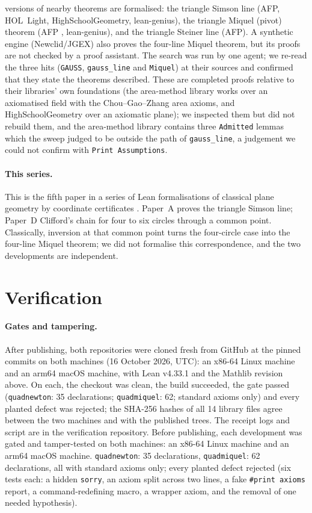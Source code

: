 \documentclass[11pt]{article}
\theoremstyle{definition}
\theoremstyle{remark}
\newcommand{\lean}[1]{\texttt{#1}}
\begin{document}
versions of nearby theorems are formalised: the triangle Simson line (AFP, HOL~Light, HighSchoolGeometry,
lean-genius), the triangle Miquel (pivot) theorem (AFP \cite{afpmiquel}, lean-genius), and the triangle
Steiner line (AFP). A synthetic engine (Newclid/JGEX) also proves the four-line Miquel theorem, but its
proofs are not checked by a proof assistant. The search was run by one agent; we re-read the three
hits (\lean{GAUSS}, \lean{gauss\_line} and \lean{Miquel}) at their sources and confirmed that they state
the theorems described. These are completed proofs relative to their libraries' own foundations
(the area-method library works over an axiomatised field with the Chou--Gao--Zhang area axioms, and
HighSchoolGeometry over an axiomatic plane); we inspected them but did not rebuild them, and the
area-method library contains three \lean{Admitted} lemmas which the sweep judged to be outside the
path of \lean{gauss\_line}, a judgement we could not confirm with \lean{Print Assumptions}.

\paragraph{This series.} This is the fifth paper in a series of Lean formalisations of classical plane
geometry by coordinate certificates \cite{paperA,paperB,paperC,paperD}. Paper~A proves the triangle
Simson line; Paper~D Clifford's chain for four to six circles through a common point. Classically, inversion at
that common point turns the four-circle case into the four-line Miquel theorem; we did not formalise
this correspondence, and the two developments are independent.

\section{Verification}\label{sec:verify}
\paragraph{Gates and tampering.} After publishing, both repositories were cloned fresh from GitHub at
the pinned commits on both machines (16 October 2026, UTC): an x86-64 Linux machine and an arm64 macOS
machine, with Lean v4.33.1 and the Mathlib revision above. On each, the checkout was clean, the build
succeeded, the gate passed (\lean{quadnewton}: 35 declarations; \lean{quadmiquel}: 62; standard axioms
only) and every planted defect was rejected; the SHA-256 hashes of all 14 library files agree between
the two machines and with the published trees. The receipt logs and script are in the verification repository.
Before publishing, each development
was gated and tamper-tested on both machines: an x86-64 Linux machine and an arm64 macOS machine.
\lean{quadnewton}: 35 declarations, \lean{quadmiquel}: 62 declarations, all with standard axioms only;
every planted defect rejected (six tests each: a hidden \lean{sorry}, an axiom split across two lines,
a fake \lean{\#print axioms} report, a command-redefining macro, a wrapper axiom, and the removal of
one needed hypothesis).
\end{document}
